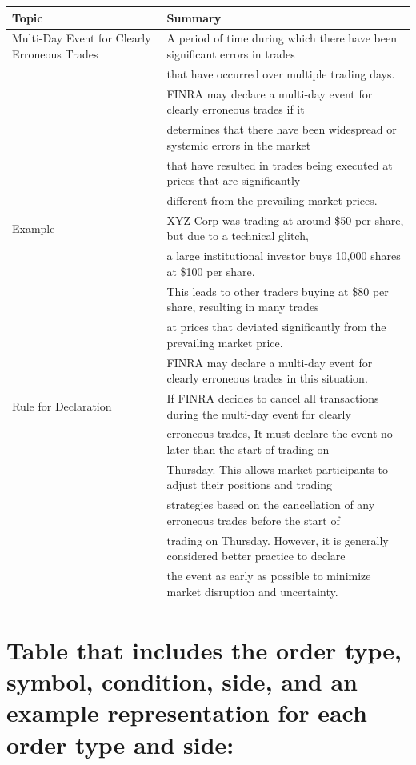 \documentclass[11pt]{article}
\begin{document}
\begin{center}
\begin{tabular}{ll}
\hline
Topic & Summary\\[0pt]
\hline
Multi-Day Event for Clearly Erroneous Trades & A period of time during which there have been significant errors in trades\\[0pt]
 & that have occurred over multiple trading days.\\[0pt]
 & FINRA may declare a multi-day event for clearly erroneous trades if it\\[0pt]
 & determines that there have been widespread or systemic errors in the market\\[0pt]
 & that have resulted in trades being executed at prices that are significantly\\[0pt]
 & different from the prevailing market prices.\\[0pt]
\hline
Example & XYZ Corp was trading at around \$50 per share, but due to a technical glitch,\\[0pt]
 & a large institutional investor buys 10,000 shares at \$100 per share.\\[0pt]
 & This leads to other traders buying at \$80 per share, resulting in many trades\\[0pt]
 & at prices that deviated significantly from the prevailing market price.\\[0pt]
 & FINRA may declare a multi-day event for clearly erroneous trades in this situation.\\[0pt]
\hline
Rule for Declaration & If FINRA decides to cancel all transactions during the multi-day event for clearly\\[0pt]
 & erroneous trades, It must declare the event no later than the start of trading on\\[0pt]
 & Thursday. This allows market participants to adjust their positions and trading\\[0pt]
 & strategies based on the cancellation of any erroneous trades before the start of\\[0pt]
 & trading on Thursday. However, it is generally considered better practice to declare\\[0pt]
 & the event as early as possible to minimize market disruption and uncertainty.\\[0pt]
\hline
\end{tabular}
\end{center}

\section{Table that includes the order type, symbol, condition, side, and an example representation for each order type and side:}
\label{sec:orgb3ac736}
\end{document}
